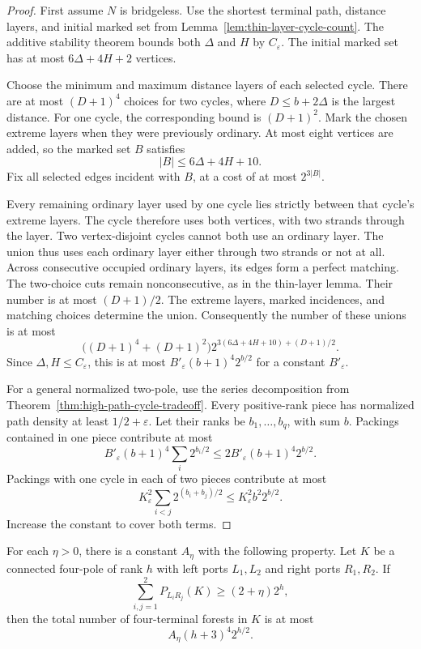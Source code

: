 \begin{proof}
First assume $N$ is bridgeless.
Use the shortest terminal path, distance layers, and initial marked set from
Lemma~\ref{lem:thin-layer-cycle-count}.
The additive stability theorem bounds both $\Delta$ and $H$ by
$C_\varepsilon$. The initial marked set has at most
$6\Delta+4H+2$ vertices.

Choose the minimum and maximum distance layers of each selected cycle.
There are at most $(D+1)^4$ choices for two cycles, where
$D\le b+2\Delta$ is the largest distance.
For one cycle, the corresponding bound is $(D+1)^2$.
Mark the chosen extreme layers when they were previously ordinary.
At most eight vertices are added, so the marked set $B$ satisfies
\[
 |B|\le6\Delta+4H+10.
\]
Fix all selected edges incident with $B$, at a cost of at most $2^{3|B|}$.

Every remaining ordinary layer used by one cycle lies strictly between
that cycle's extreme layers. The cycle therefore uses both vertices, with
two strands through the layer.
Two vertex-disjoint cycles cannot both use an ordinary layer.
The union thus uses each ordinary layer either through two strands or not at all.
Across consecutive occupied ordinary layers, its edges form a perfect matching.
The two-choice cuts remain nonconsecutive, as in the thin-layer lemma.
Their number is at most $(D+1)/2$.
The extreme layers, marked incidences, and matching choices determine the union.
Consequently the number of these unions is at most
\[
 \bigl((D+1)^4+(D+1)^2\bigr)
 2^{3(6\Delta+4H+10)+(D+1)/2}.
\]
Since $\Delta,H\le C_\varepsilon$, this is at most
$B'_\varepsilon(b+1)^4 2^{b/2}$ for a constant $B'_\varepsilon$.

For a general normalized two-pole, use the series decomposition from
Theorem~\ref{thm:high-path-cycle-tradeoff}.
Every positive-rank piece has normalized path density at least
$1/2+\varepsilon$.
Let their ranks be $b_1,\ldots,b_q$, with sum $b$.
Packings contained in one piece contribute at most
\[
 B'_\varepsilon(b+1)^4\sum_i2^{b_i/2}
 \le2B'_\varepsilon(b+1)^4 2^{b/2}.
\]
Packings with one cycle in each of two pieces contribute at most
\[
 K_\varepsilon^2\sum_{i<j}2^{(b_i+b_j)/2}
 \le K_\varepsilon^2b^2 2^{b/2}.
\]
Increase the constant to cover both terms.
\end{proof}

\begin{corollary}
\label{cor:four-pole-cross-sum-forest}
For each $\eta>0$, there is a constant $A_\eta$ with the following property.
Let $K$ be a connected four-pole of rank $h$ with left ports $L_1,L_2$
and right ports $R_1,R_2$.
If
\[
 \sum_{i,j=1}^2P_{L_iR_j}(K)\ge(2+\eta)2^h,
\]
then the total number of four-terminal forests in $K$ is at most
\[
 A_\eta(h+3)^4 2^{h/2}.
\]
\end{corollary}


